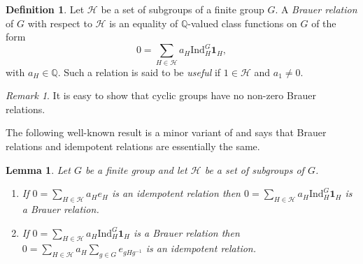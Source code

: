 \documentclass[12pt]{amsart}
\theoremstyle{plain}
\newtheorem{lemma}[theorem]{Lemma}
\theoremstyle{remark}
\newtheorem{remark}[theorem]{Remark}
\theoremstyle{definition}
\newtheorem{definition}[theorem]{Definition}
\newcommand{\Q}{\mathbb{Q}}
\newcommand{\Ind}{\mathrm{Ind}}
\numberwithin{equation}{section}
\begin{document}
\begin{definition}
Let $\mathcal{H}$ be a set of subgroups of a finite group $G$. 
A \emph{Brauer relation} of $G$ with respect to $\mathcal{H}$ is an equality of 
$\Q$-valued class functions on $G$ of the form
\[
 0=\sum_{H\in\mathcal{H}}a_H\Ind_{H}^{G}\mathbf{1}_{H},
\]
with $a_{H} \in \Q$.
Such a relation is said to be \emph{useful} if $1 \in \mathcal{H}$
and $a_{1} \neq 0$.
\end{definition}

\begin{remark}\label{rmk:cyclic-no-brauer}
It is easy to show that cyclic groups have no non-zero Brauer relations. 
\end{remark}

The following well-known result is a minor variant of \cite[Proposition 2.7]{MR4440537} and says 
that Brauer relations and idempotent relations are essentially the same.

\begin{lemma}\label{lemma:brauer-versus-idempotent-relation}
Let $G$ be a finite group and let $\mathcal{H}$ be a set of subgroups of $G$.
\begin{enumerate}
\item If $0=\sum_{H \in \mathcal{H}} a_{H} e_{H}$ is an idempotent relation
then $0=\sum_{H \in \mathcal{H}} a_{H} \Ind_{H}^{G} \mathbf{1}_{H}$ is a Brauer relation.
\item If $0=\sum_{H \in \mathcal{H}} a_{H} \Ind_{H}^{G} \mathbf{1}_{H}$ is a Brauer relation then
$0=\sum_{H \in \mathcal{H}} a_{H} \sum_{g \in G} e_{gHg^{-1}}$ is an idempotent relation. 
\end{enumerate}
\end{lemma}
\end{document}
